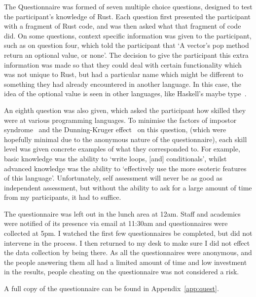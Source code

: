 The Questionnaire was formed of seven multiple choice questions, designed to test the participant's knowledge of Rust. Each question first presented the participant with a fragment of Rust code, and was then asked what that fragment of code did. On some questions, context specific information was given to the participant, such as on question four, which told the participant that `A vector’s pop method return an optional value, or none'. The decision to give the participant this extra information was made so that they could deal with certain functionality which was not unique to Rust, but had a particular name which might be different to something they had already encountered in another language. In this case, the idea of the optional value is seen in other languages, like Haskell's maybe type~\cite{HaskellMaybe}.

An eighth question was also given, which asked the participant how skilled they were at various programming languages.
To minimise the factors of impostor syndrome~\cite{langford1993} and the Dunning-Kruger effect~\cite{kruger1999} on this question, (which were hopefully minimal due to the anonymous nature of the questionnaire), each skill level was given concrete examples of what they corresponded to. For example, basic knowledge was the ability to `write loops, [and] conditionals', whilst advanced knowledge was the ability to `effectively use the more esoteric features of this language'. Unfortunately, self assessment will never be as good as independent assessment, but without the ability to ask for a large amount of time from my participants, it had to suffice.

The questionnaire was left out in the lunch area at 12am. Staff and academics were notified of its presence via email at 11:30am and questionnaires were collected at 5pm. I watched the first few questionnaires be completed, but did not intervene in the process. I then returned to my desk to make sure I did not effect the data collection by being there. As all the questionnaires were anonymous, and the people answering them all had a limited amount of time and low investment in the results, people cheating on the questionnaire was not considered a risk. 

A full copy of the questionnaire can be found in Appendix~\ref{app:quest}.
